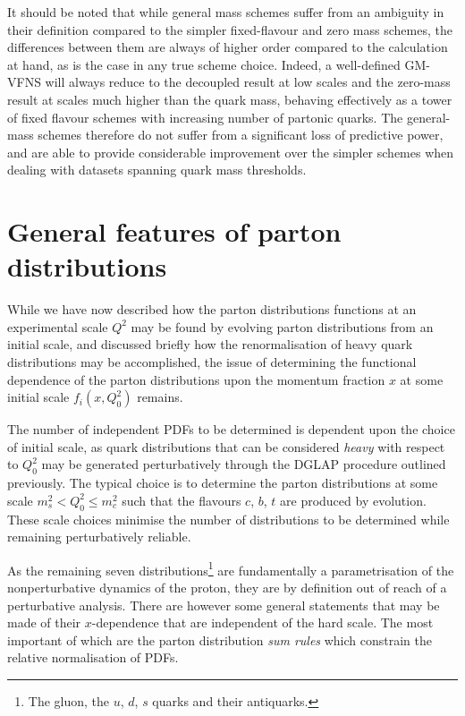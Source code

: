 It should be noted that while general mass schemes suffer from an ambiguity in their definition compared to the simpler fixed-flavour and zero mass schemes, the differences between them are always of higher order compared to the calculation at hand, as is the case in any true scheme choice. Indeed, a well-defined GM-VFNS will always reduce to the decoupled result at low scales and the zero-mass result at scales much higher than the quark mass, behaving effectively as a tower of fixed flavour schemes with increasing number of partonic quarks. The general-mass schemes therefore do not suffer from a significant loss of predictive power, and are able to provide considerable improvement over the simpler schemes when dealing with datasets spanning quark mass thresholds.
%
\section{General features of parton distributions}
%
While we have now described how the parton distributions functions at an experimental scale $Q^2$ may be found by evolving parton distributions from an initial scale, and discussed briefly how the renormalisation of heavy quark distributions may be accomplished, the issue of determining the functional dependence of the parton distributions upon the momentum fraction $x$ at some initial scale $f_i(x,Q_0^2)$ remains. 

The number of independent PDFs to be determined is dependent upon the choice of initial scale, as quark distributions that can be considered \emph{heavy} with respect to $Q^2_0$ may be generated perturbatively through the DGLAP procedure outlined previously. The typical choice is to determine the parton distributions at some scale $ m_s^2< Q^2_0 \le m_c^2$ such that the flavours $c$, $b$, $t$ are produced by evolution. These scale choices minimise the number of distributions to be determined while remaining perturbatively reliable.

As the remaining seven distributions\footnote{The gluon, the $u$, $d$, $s$ quarks and their antiquarks.} are fundamentally a parametrisation of the nonperturbative dynamics of the proton, they are by definition out of reach of a perturbative analysis. There are however some general statements that may be made of their $x$-dependence that are independent of the hard scale. The most important of which are the parton distribution \emph{sum rules} which constrain the relative normalisation of PDFs.

